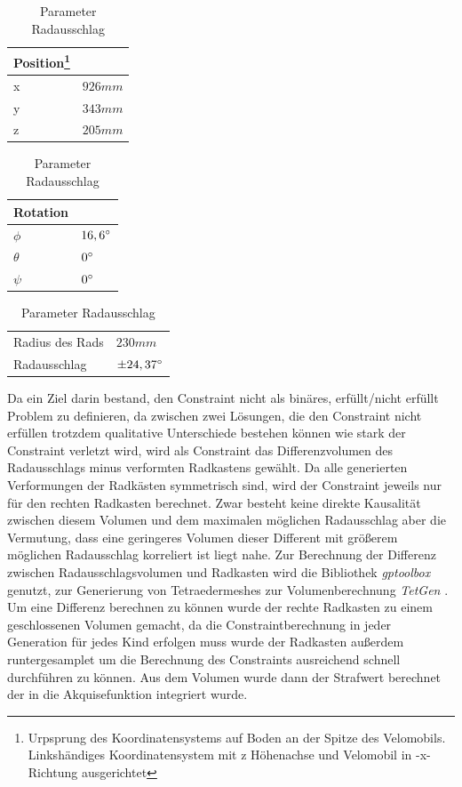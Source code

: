 \begin{table}[h]
	\begin{tabularx}{.5\textwidth}{ll}\hline
		
		Position\footnote{Urpsprung des Koordinatensystems auf Boden an der Spitze des Velomobils. Linkshändiges Koordinatensystem mit z Höhenachse und Velomobil in -x-Richtung ausgerichtet} & \\
		\hline
		x &	$926mm$ \\
		y &	$343mm$ \\
		z &	$205mm$	\\
	\end{tabularx}
	\begin{tabularx}{.5\textwidth}{ll}\hline
		Rotation & \\ \hline
		$\phi$ & $16,6\degree$ \\
		$\theta$ & $0\degree$ \\
		$\psi$ & $0\degree$ \\
	\end{tabularx}
	\begin{tabularx}{.5\linewidth}{ll}
		Radius des Rads & $230mm$ \\
		Radausschlag & $\pm24,37\degree$\\
		
	\end{tabularx}

\label{tab:wheel_params}
\caption{Parameter Radausschlag}
\end{table}

Da ein Ziel darin bestand, den Constraint nicht als binäres, erfüllt/nicht erfüllt Problem zu definieren, da zwischen zwei Lösungen, die den Constraint nicht erfüllen trotzdem qualitative Unterschiede bestehen können wie stark der Constraint verletzt wird, wird als Constraint das Differenzvolumen des Radausschlags minus verformten Radkastens gewählt.
Da alle generierten Verformungen der Radkästen symmetrisch sind, wird der Constraint jeweils nur für den rechten Radkasten berechnet.
Zwar besteht keine direkte Kausalität zwischen diesem Volumen und dem maximalen möglichen Radausschlag aber die Vermutung, dass eine geringeres Volumen dieser Different mit größerem möglichen Radausschlag korreliert ist liegt nahe.
Zur Berechnung der Differenz zwischen Radausschlagsvolumen und Radkasten wird die Bibliothek \textit{gptoolbox} \cite{gptoolbox.b} genutzt, zur Generierung von Tetraedermeshes zur Volumenberechnung \textit{TetGen} \cite{Si.2015}.
Um eine Differenz berechnen zu können wurde der rechte Radkasten zu einem geschlossenen Volumen gemacht, da die Constraintberechnung in jeder Generation für jedes Kind erfolgen muss wurde der Radkasten außerdem runtergesamplet  um die Berechnung  des Constraints ausreichend schnell durchführen zu können.
Aus dem Volumen wurde dann der Strafwert berechnet der in die Akquisefunktion integriert wurde.

